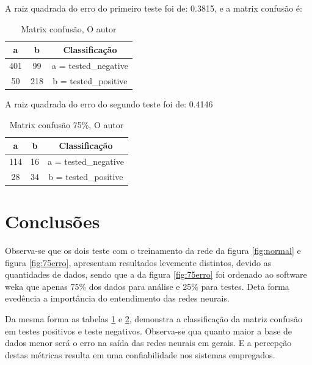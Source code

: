 \par A raiz quadrada do erro do primeiro teste foi de: 0.3815, e a matrix confusão é:
\begin{table}[h!]
\center
  \begin{tabular}{| c | c | c |}
  \hline
    a & b & Classificação\\
    \hline
    401 & 99 &  a = tested\_negative\\
    50 & 218 &  b = tested\_positive\\
    \hline
  \end{tabular}
  \caption{Matrix confusão, O autor}
  \label{tab:normal}
\end{table}
\par A raiz quadrada do erro do segundo teste foi de: 0.4146
\begin{table}[h!]
\center
  \begin{tabular}{| c | c | c |}
  \hline
    a & b & Classificação\\
    \hline
    114 & 16 &  a = tested\_negative\\
    28 & 34 &  b = tested\_positive\\
    \hline
  \end{tabular}
\caption{Matrix confusão 75\%, O autor}
\label{tab:75}
\end{table}
\section{Conclusões}
\par Observa-se que os dois teste com o treinamento da rede da figura \ref{fig:normal} e figura \ref{fig:75erro}, apresentam resultados levemente distintos, devido as quantidades de dados, sendo que a da figura \ref{fig:75erro} foi ordenado ao software weka que apenas 75\% dos dados para análise e 25\% para testes. Deta forma evedência a importância do entendimento das redes neurais.
\par Da mesma forma as tabelas \ref{tab:normal} e \ref{tab:75}, demonstra a classificação da matriz confusão em testes positivos e teste negativos. Observa-se qua quanto maior a base de dados menor será o erro na saída das redes neurais em gerais. E a percepção destas métricas resulta em uma confiabilidade nos sistemas empregados.



